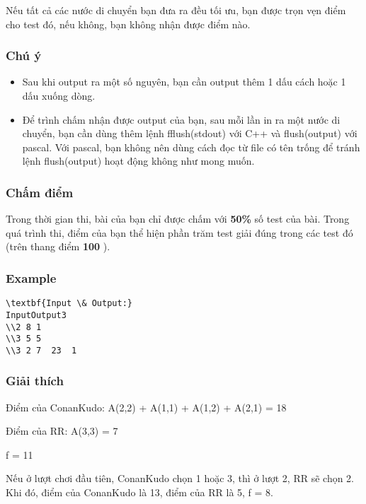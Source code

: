    Nếu tất cả các nước di chuyển bạn đưa ra đều tối ưu, bạn được trọn vẹn điểm cho test đó, nếu không, bạn không nhận được điểm nào.  

\subsubsection{   Chú ý  }
\begin{itemize}
	\item     Sau khi output ra một số nguyên, bạn cần output thêm 1 dấu cách hoặc 1 dấu xuống dòng.   
	\item     Để trình chấm nhận được output của bạn, sau mỗi lần in ra một nước di chuyển, bạn cần dùng thêm lệnh fflush(stdout) với C++ và flush(output) với pascal. Với pascal, bạn không nên dùng cách đọc từ file có tên trống để tránh lệnh flush(output) hoạt động không như mong muốn.   
\end{itemize}

\subsubsection{   Chấm điểm  }

   Trong thời gian thi, bài của bạn chỉ được chấm với   \textbf{    50\%   }   số test của bài. Trong quá trình thi, điểm của bạn thể hiện phần trăm test giải đúng trong các test đó (trên thang điểm   \textbf{    100   }   ).  

\subsubsection{   Example  }
\begin{verbatim}
\textbf{Input \& Output:}
InputOutput3
\\2 8 1
\\3 5 5
\\3 2 7  23  1\end{verbatim}

\subsubsection{   Giải thích  }

   Điểm của ConanKudo: A(2,2) + A(1,1) + A(1,2) + A(2,1) = 18  

   Điểm của RR: A(3,3) = 7  

   f = 11  

   Nếu ở lượt chơi đầu tiên, ConanKudo chọn 1 hoặc 3, thì ở lượt 2, RR sẽ chọn 2. Khi đó, điểm của ConanKudo là 13, điểm của RR là 5, f = 8.  
